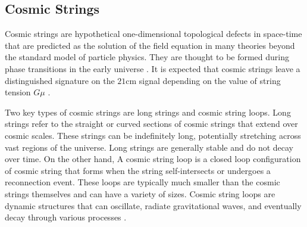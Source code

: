 \documentclass[12pt, TexShade, letterpaper]{report}
\begin{document}
\subsection{Cosmic Strings}
 Cosmic strings are hypothetical one-dimensional topological defects in space-time that are predicted as the solution of the field equation in many theories beyond the standard model of particle physics. They are thought to be formed during phase transitions in the early universe \cite{bryce_thesis, constrain_superconduct}.
 It is expected that cosmic strings leave a distinguished signature on the $\mathrm{21cm}$ signal depending on the value of string tension $G\mu$ \cite{cosmic_string_brandenberger, structure_cosmic_string}.\par
Two key types of cosmic strings are long strings and cosmic string loops. Long strings refer to the straight or curved sections of cosmic strings that extend over cosmic scales. These strings can be indefinitely long, potentially stretching across vast regions of the universe. Long strings are generally stable and do not decay over time. On the other hand, A cosmic string loop is a closed loop configuration of cosmic string that forms when the string self-intersects or undergoes a reconnection event. These loops are typically much smaller than the cosmic strings themselves and can have a variety of sizes. Cosmic string loops are dynamic structures that can oscillate, radiate gravitational waves, and eventually decay through various processes \cite{cosmic_strings_book}.  \par
\end{document}

